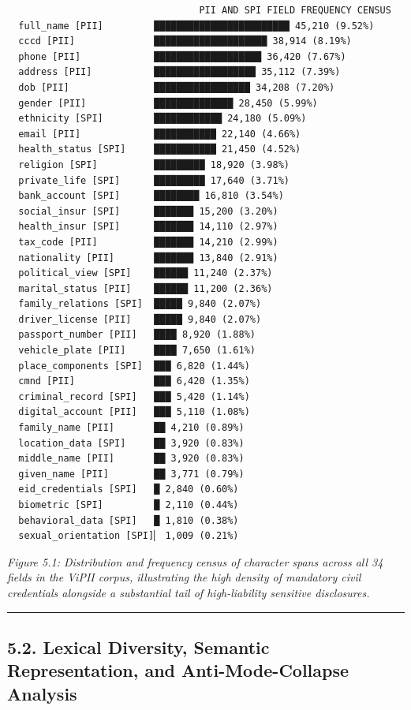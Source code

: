 \documentclass[
]{article}
\begin{document}
\begin{verbatim}
                                  PII AND SPI FIELD FREQUENCY CENSUS
  full_name [PII]         ████████████████████████ 45,210 (9.52%)
  cccd [PII]              ████████████████████ 38,914 (8.19%)
  phone [PII]             ███████████████████ 36,420 (7.67%)
  address [PII]           ██████████████████ 35,112 (7.39%)
  dob [PII]               █████████████████ 34,208 (7.20%)
  gender [PII]            ██████████████ 28,450 (5.99%)
  ethnicity [SPI]         ████████████ 24,180 (5.09%)
  email [PII]             ███████████ 22,140 (4.66%)
  health_status [SPI]     ███████████ 21,450 (4.52%)
  religion [SPI]          █████████ 18,920 (3.98%)
  private_life [SPI]      █████████ 17,640 (3.71%)
  bank_account [SPI]      ████████ 16,810 (3.54%)
  social_insur [SPI]      ███████ 15,200 (3.20%)
  health_insur [SPI]      ███████ 14,110 (2.97%)
  tax_code [PII]          ███████ 14,210 (2.99%)
  nationality [PII]       ███████ 13,840 (2.91%)
  political_view [SPI]    ██████ 11,240 (2.37%)
  marital_status [PII]    ██████ 11,200 (2.36%)
  family_relations [SPI]  █████ 9,840 (2.07%)
  driver_license [PII]    █████ 9,840 (2.07%)
  passport_number [PII]   ████ 8,920 (1.88%)
  vehicle_plate [PII]     ████ 7,650 (1.61%)
  place_components [SPI]  ███ 6,820 (1.44%)
  cmnd [PII]              ███ 6,420 (1.35%)
  criminal_record [SPI]   ███ 5,420 (1.14%)
  digital_account [PII]   ███ 5,110 (1.08%)
  family_name [PII]       ██ 4,210 (0.89%)
  location_data [SPI]     ██ 3,920 (0.83%)
  middle_name [PII]       ██ 3,920 (0.83%)
  given_name [PII]        ██ 3,771 (0.79%)
  eid_credentials [SPI]   █ 2,840 (0.60%)
  biometric [SPI]         █ 2,110 (0.44%)
  behavioral_data [SPI]   █ 1,810 (0.38%)
  sexual_orientation [SPI]▏ 1,009 (0.21%)
\end{verbatim}

\emph{Figure 5.1: Distribution and frequency census of character spans
across all 34 fields in the ViPII corpus, illustrating the high density
of mandatory civil credentials alongside a substantial tail of
high-liability sensitive disclosures.}

\begin{center}\rule{0.5\linewidth}{0.5pt}\end{center}

\subsection{5.2. Lexical Diversity, Semantic Representation, and
Anti-Mode-Collapse
Analysis}\label{lexical-diversity-semantic-representation-and-anti-mode-collapse-analysis}
\end{document}
